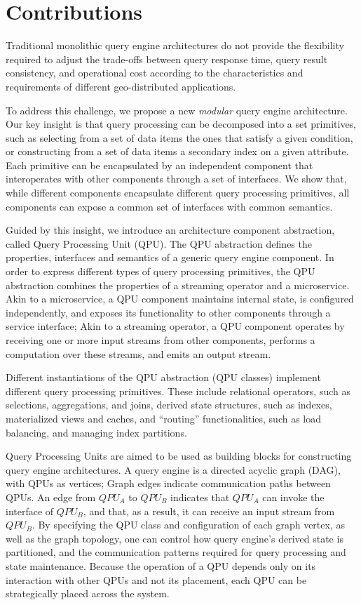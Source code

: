 \section{Contributions}

Traditional monolithic query engine architectures do not provide the flexibility required to adjust the trade-offs
between query response time, query result consistency, and operational cost according to the characteristics and
requirements of different geo-distributed applications.

To address this challenge, we propose a new \textit{modular} query engine architecture.
Our key insight is that query processing can be decomposed into a set primitives,
such as selecting from a set of data items the ones that satisfy a given condition,
or constructing from a set of data items a secondary index on a given attribute.
Each primitive can be encapsulated by an independent component that interoperates with other components through a set of interfaces.
We show that, while different components encapsulate different query processing primitives,
all components can expose a common set of interfaces with common semantics.

Guided by this insight,
we introduce an architecture component abstraction, called Query Processing Unit (QPU).
The QPU abstraction defines the properties, interfaces and semantics of a generic query engine component.
In order to express different types of query processing primitives,
the QPU abstraction combines the properties of a streaming operator and a microservice.
Akin to a microservice, a QPU component maintains internal state, is configured independently, and exposes its functionality to other components through a service interface;
Akin to a streaming operator, a QPU component operates by receiving one or more input streams from other components,
performs a computation over these streams, and emits an output stream.

Different instantiations of the QPU abstraction (QPU classes) implement different query processing primitives.
These include relational operators, such as selections, aggregations, and joins,
derived state structures, such as indexes, materialized views and caches,
and ``routing'' functionalities, such as load balancing, and managing index partitions.

Query Processing Units are aimed to be used as building blocks for constructing query engine architectures.
A query engine is a directed acyclic graph (DAG), with QPUs as vertices;
Graph edges indicate communication paths between QPUs.
An edge from $QPU_A$ to $QPU_B$ indicates that $QPU_A$ can invoke the interface of $QPU_B$,
and that, as a result, it can receive an input stream from $QPU_B$.
By specifying the QPU class and configuration of each graph vertex, as well as the graph topology,
one can control how query engine's derived state is partitioned,
and the communication patterns required for query processing and state maintenance.
Because the operation of a QPU depends only on its interaction with other QPUs and not its placement,
each QPU can be strategically placed across the system.

